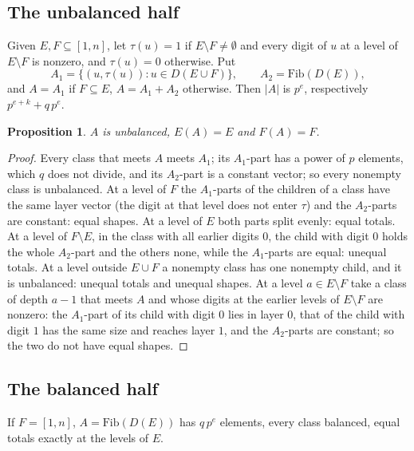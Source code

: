 \documentclass[11pt,a4paper]{amsart}
\newtheorem{proposition}[theorem]{Proposition}
\theoremstyle{definition}
\theoremstyle{remark}
\begin{document}
\subsection{The unbalanced half} Given $E,F\subseteq[1,n]$, let $\tau(u)=1$ if $E\setminus F\ne\emptyset$
and every digit of $u$ at a level of $E\setminus F$ is nonzero, and $\tau(u)=0$ otherwise. Put
\[ A_1=\{(u,\tau(u)):u\in D(E\cup F)\},\qquad A_2=\mathrm{Fib}(D(E)), \]
and $A=A_1$ if $F\subseteq E$, $A=A_1+A_2$ otherwise. Then $|A|$ is $p^{e}$, respectively $p^{e+k}+q\,p^{e}$.

\begin{proposition}\label{prop:CU}
$A$ is unbalanced, $E(A)=E$ and $F(A)=F$.
\end{proposition}
\begin{proof}
Every class that meets $A$ meets $A_1$; its $A_1$-part has a power of $p$ elements, which $q$ does not
divide, and its $A_2$-part is a constant vector; so every nonempty class is unbalanced. At a level of $F$ the
$A_1$-parts of the children of a class have the same layer vector (the digit at that level does not enter
$\tau$) and the $A_2$-parts are constant: equal shapes. At a level of $E$ both parts split evenly: equal
totals. At a level of $F\setminus E$, in the class with all earlier digits $0$, the child with digit $0$
holds the whole $A_2$-part and the others none, while the $A_1$-parts are equal: unequal totals. At a level
outside $E\cup F$ a nonempty class has one nonempty child, and it is unbalanced: unequal totals and unequal
shapes. At a level $a\in E\setminus F$ take a class of depth $a-1$ that meets $A$ and whose digits at the
earlier levels of $E\setminus F$ are nonzero: the $A_1$-part of its child with digit $0$ lies in layer $0$,
that of the child with digit $1$ has the same size and reaches layer $1$, and the $A_2$-parts are constant;
so the two do not have equal shapes.
\end{proof}

\subsection{The balanced half} If $F=[1,n]$, $A=\mathrm{Fib}(D(E))$ has $q\,p^e$ elements, every class
balanced, equal totals exactly at the levels of $E$.
\end{document}

